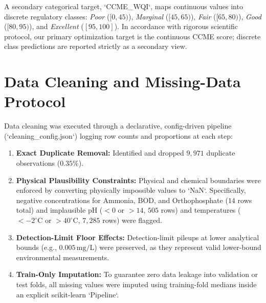 \documentclass[journal,10pt,twocolumn]{IEEEtran}
\begin{document}
A secondary categorical target, `CCME_WQI`, maps continuous values into discrete regulatory classes: \textit{Poor} ($[0, 45)$), \textit{Marginal} ($[45, 65)$), \textit{Fair} ($[65, 80)$), \textit{Good} ($[80, 95)$), and \textit{Excellent} ($[95, 100]$). In accordance with rigorous scientific protocol, our primary optimization target is the continuous CCME score; discrete class predictions are reported strictly as a secondary view.

\section{Data Cleaning and Missing-Data Protocol}
Data cleaning was executed through a declarative, config-driven pipeline (`cleaning_config.json`) logging row counts and proportions at each step:
\begin{enumerate}
    \item \textbf{Exact Duplicate Removal:} Identified and dropped $9,971$ duplicate observations ($0.35\%$).
    \item \textbf{Physical Plausibility Constraints:} Physical and chemical boundaries were enforced by converting physically impossible values to `NaN`. Specifically, negative concentrations for Ammonia, BOD, and Orthophosphate ($14$ rows total) and implausible pH ($<0$ or $>14$, $505$ rows) and temperatures ($<-2^\circ\text{C}$ or $>40^\circ\text{C}$, $7,285$ rows) were flagged.
    \item \textbf{Detection-Limit Floor Effects:} Detection-limit pileups at lower analytical bounds (e.g., $0.005\,\text{mg/L}$) were preserved, as they represent valid lower-bound environmental measurements.
    \item \textbf{Train-Only Imputation:} To guarantee zero data leakage into validation or test folds, all missing values were imputed using training-fold medians inside an explicit scikit-learn `Pipeline`.
\end{enumerate}
\end{document}
